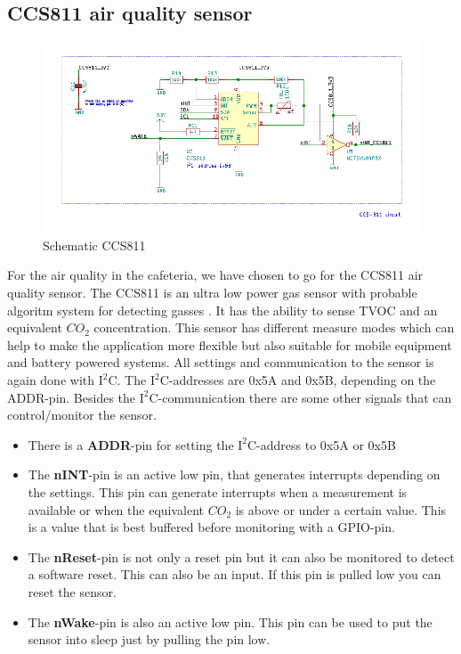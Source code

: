 \documentclass[11pt,a4paper]{article}
\begin{document}
\subsection{CCS811 air quality sensor}
\begin{figure}[H]
	\centering
	\includegraphics[width=1\linewidth]{Schematic_CCS811.png}
	\caption{Schematic CCS811}
	\label{fig:CCS811}
\end{figure}
For the air quality in the cafeteria, we have chosen to go for the CCS811 air quality sensor. The CCS811 is an ultra low power gas sensor with probable algoritm system for detecting gasses \cite{bib:CCS811}. It has the ability to sense TVOC and an equivalent $CO_{2}$ concentration. This sensor has different measure modes which can help to make the application more flexible but also suitable for mobile equipment and battery powered systems. All settings and communication to the sensor is again done with $\text{I}^2$C. The $\text{I}^2$C-addresses are 0x5A and 0x5B, depending on the ADDR-pin. Besides the $\text{I}^2$C-communication there are some other signals that can control/monitor the sensor. 
\begin{itemize}
	\item There is a \textbf{ADDR}-pin for setting the $\text{I}^2$C-address to 0x5A or 0x5B
	\item The\textbf{ nINT}-pin is an active low pin, that generates interrupts depending on the settings. This pin can generate interrupts when a measurement is available or when the equivalent $CO_{2}$ is above or under a certain value. This is a value that is best buffered before monitoring with a GPIO-pin.
	\item The \textbf{nReset}-pin is not only a reset pin but it can also be monitored to detect a software reset. This can also be an input. If this pin is pulled low you can reset the sensor.
	\item The \textbf{nWake}-pin is also an active low pin. This pin can be used to put the sensor into sleep just by pulling the pin low.
\end{itemize}
\end{document}
